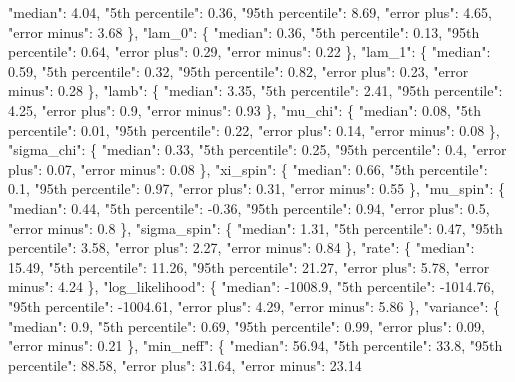 {{          "median": 4.04, %
          "5th percentile": 0.36, %
          "95th percentile": 8.69, %
          "error plus": 4.65, %
          "error minus": 3.68%
        \}, %
        "lam\_0": \{%
          "median": 0.36, %
          "5th percentile": 0.13, %
          "95th percentile": 0.64, %
          "error plus": 0.29, %
          "error minus": 0.22%
        \}, %
        "lam\_1": \{%
          "median": 0.59, %
          "5th percentile": 0.32, %
          "95th percentile": 0.82, %
          "error plus": 0.23, %
          "error minus": 0.28%
        \}, %
        "lamb": \{%
          "median": 3.35, %
          "5th percentile": 2.41, %
          "95th percentile": 4.25, %
          "error plus": 0.9, %
          "error minus": 0.93%
        \}, %
        "mu\_chi": \{%
          "median": 0.08, %
          "5th percentile": 0.01, %
          "95th percentile": 0.22, %
          "error plus": 0.14, %
          "error minus": 0.08%
        \}, %
        "sigma\_chi": \{%
          "median": 0.33, %
          "5th percentile": 0.25, %
          "95th percentile": 0.4, %
          "error plus": 0.07, %
          "error minus": 0.08%
        \}, %
        "xi\_spin": \{%
          "median": 0.66, %
          "5th percentile": 0.1, %
          "95th percentile": 0.97, %
          "error plus": 0.31, %
          "error minus": 0.55%
        \}, %
        "mu\_spin": \{%
          "median": 0.44, %
          "5th percentile": {-}0.36, %
          "95th percentile": 0.94, %
          "error plus": 0.5, %
          "error minus": 0.8%
        \}, %
        "sigma\_spin": \{%
          "median": 1.31, %
          "5th percentile": 0.47, %
          "95th percentile": 3.58, %
          "error plus": 2.27, %
          "error minus": 0.84%
        \}, %
        "rate": \{%
          "median": 15.49, %
          "5th percentile": 11.26, %
          "95th percentile": 21.27, %
          "error plus": 5.78, %
          "error minus": 4.24%
        \}, %
        "log\_likelihood": \{%
          "median": {-}1008.9, %
          "5th percentile": {-}1014.76, %
          "95th percentile": {-}1004.61, %
          "error plus": 4.29, %
          "error minus": 5.86%
        \}, %
        "variance": \{%
          "median": 0.9, %
          "5th percentile": 0.69, %
          "95th percentile": 0.99, %
          "error plus": 0.09, %
          "error minus": 0.21%
        \}, %
        "min\_neff": \{%
          "median": 56.94, %
          "5th percentile": 33.8, %
          "95th percentile": 88.58, %
          "error plus": 31.64, %
          "error minus": 23.14%
}}
